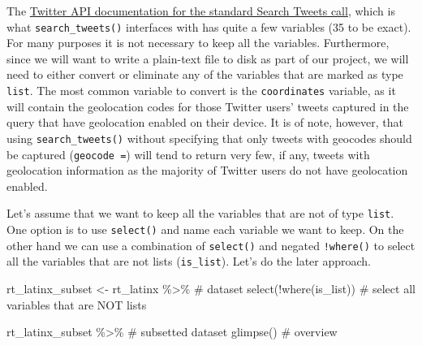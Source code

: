 \documentclass[
  letterpaper,
]{latex/krantz}
\newenvironment{Shaded}{\begin{snugshade}}{\end{snugshade}}
\newcommand{\CommentTok}[1]{\textcolor[rgb]{0.37,0.37,0.37}{#1}}
\newcommand{\FunctionTok}[1]{\textcolor[rgb]{0.28,0.35,0.67}{#1}}
\newcommand{\NormalTok}[1]{\textcolor[rgb]{0.00,0.23,0.31}{#1}}
\newcommand{\OtherTok}[1]{\textcolor[rgb]{0.00,0.23,0.31}{#1}}
\newcommand{\SpecialCharTok}[1]{\textcolor[rgb]{0.37,0.37,0.37}{#1}}
\begin{document}
The
\href{https://developer.twitter.com/en/docs/twitter-api/v1/tweets/search/api-reference/get-search-tweets}{Twitter
API documentation for the standard Search Tweets call}, which is what
\texttt{search\_tweets()} interfaces with has quite a few variables (35
to be exact). For many purposes it is not necessary to keep all the
variables. Furthermore, since we will want to write a plain-text file to
disk as part of our project, we will need to either convert or eliminate
any of the variables that are marked as type \texttt{list}. The most
common variable to convert is the \texttt{coordinates} variable, as it
will contain the geolocation codes for those Twitter users' tweets
captured in the query that have geolocation enabled on their device. It
is of note, however, that using \texttt{search\_tweets()} without
specifying that only tweets with geocodes should be captured
(\texttt{geocode\ =}) will tend to return very few, if any, tweets with
geolocation information as the majority of Twitter users do not have
geolocation enabled.

Let's assume that we want to keep all the variables that are not of type
\texttt{list}. One option is to use \texttt{select()} and name each
variable we want to keep. On the other hand we can use a combination of
\texttt{select()} and negated \texttt{!where()} to select all the
variables that are not lists (\texttt{is\_list}). Let's do the later
approach.

\begin{Shaded}
\begin{Highlighting}[]
\NormalTok{rt\_latinx\_subset }\OtherTok{\textless{}{-}} 
\NormalTok{  rt\_latinx }\SpecialCharTok{\%\textgreater{}\%} \CommentTok{\# dataset}
  \FunctionTok{select}\NormalTok{(}\SpecialCharTok{!}\FunctionTok{where}\NormalTok{(is\_list))  }\CommentTok{\# select all variables that are NOT lists}

\NormalTok{rt\_latinx\_subset }\SpecialCharTok{\%\textgreater{}\%} \CommentTok{\# subsetted dataset}
  \FunctionTok{glimpse}\NormalTok{() }\CommentTok{\# overview}
\end{Highlighting}
\end{Shaded}
\end{document}
